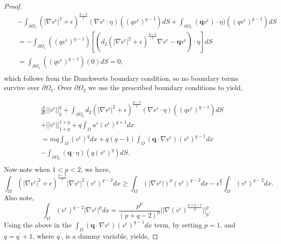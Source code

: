 \documentclass[10pt,a4paper]{amsart}
\begin{document}
\begin{proof}
\begin{eqnarray}
 &&   -\int_{\partial \Omega_{1}} \left(
|\nabla v^{\epsilon}|^{2}+{\epsilon}\right)^{\frac{p-2}{2}}( \nabla v^{\epsilon} \cdot \eta ) ((qv^{\epsilon})^{q-1}) dS
+ \int_{\partial \Omega_{1}} (\textbf{q} v^{\epsilon}) \cdot \eta) ((qv^{\epsilon})^{q-1}) dS \nonumber \\
&& = - \int_{\partial \Omega_{1}} ((qv^{\epsilon})^{q-1})  [(d_2  \left(|\nabla v^{\epsilon}|^{2}+{\epsilon}\right)^{\frac{p-2}{2}}  \nabla v^{\epsilon} - \textbf{q} v^{\epsilon})  \cdot \eta] dS \nonumber \\
&& = \int_{\partial \Omega_{1}} ((qv^{\epsilon})^{q-1}) (0)dS = 0, \nonumber \\
\end{eqnarray}
%
which follows from the Danckwerts boundary condition, so no boundary terms survive over $\partial \Omega_{1}$. Over $\partial \Omega_{2}$ we use the prescribed boundary conditions to yield,


\begin{eqnarray}
&& \frac{d}{dt}||v^{\epsilon}||^{q}_{q} + 
\int_{\partial \Omega_{2}} d_{2}\left(
|\nabla v^{\epsilon}|^{2}+{\epsilon}\right)^{\frac{p-2}{2}}( \nabla v^{\epsilon} \cdot \eta ) ((qv^{\epsilon})^{q-1}) dS \nonumber \\
&&+||v^{\epsilon}||^{1+q}_{1+q} 
 + q\int_{\Omega}  u^{\epsilon}(v^{\epsilon})^{q+1}dx \nonumber \\
 && =mq\int_{\Omega} (v^{\epsilon})^{q}dx + q(q-1)\int_{\Omega} (\textbf{q}\cdot \nabla v^{\epsilon}) (v^{\epsilon})^{q-1}dx \nonumber \\
 &&  
 - \int_{\partial \Omega_{2}} (\textbf{q}  \cdot \eta) (q(v^{\epsilon})^{q}) dS .
 \nonumber \\
\end{eqnarray}
%
%
Now note when $1<p<2$, we have,
\begin{equation}
\label{eq:in1}
\int_{\Omega} \left(
|\nabla v^{\epsilon}|^{2}+{\epsilon}\right)^{\frac{p-2}{2}}|\nabla v^{\epsilon}|^{2} (v^{\epsilon})^{q-2} dx
\geq 
\int_{\Omega} \left(
|\nabla v^{\epsilon}|\right)^{p}(v^{\epsilon})^{q-2} dx - \epsilon^{\frac{p}{2}}\int_{\Omega} (v^{\epsilon})^{q-2} dx .
\end{equation}
%
Also note,
\begin{equation}
\label{eq:in2}
\int_{\Omega} (v^{\epsilon})^{q-2}|\nabla v^{\epsilon}|^{p}dx = \frac{p^{p}}{(p+q-2)^{p}}||\nabla (v^{\epsilon})^{\frac{p+q-2}{p}}||^{p}_{p}.
\end{equation}
%
Using the above in the $\int_{\Omega} (\textbf{q}\cdot \nabla v^{\epsilon}) (v^{\epsilon})^{q-1}dx$ term, by setting $p=1$, and $q=q^{'}+1$, where $q^{'}$, is a dummy variable, yields, 


\end{proof}
\end{document}
